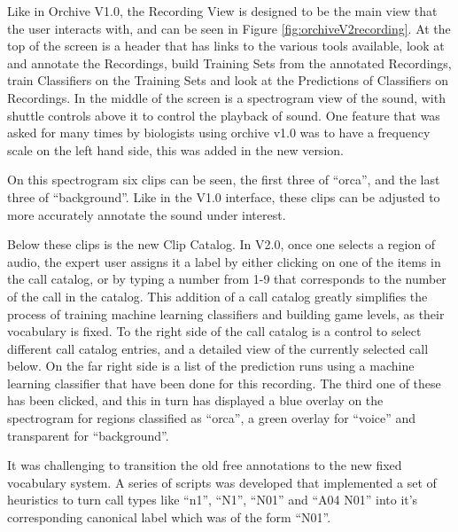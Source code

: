 Like in Orchive V1.0, the Recording View is designed to be the main
view that the user interacts with, and can be seen in Figure
\ref{fig:orchiveV2recording}.  At the top of the screen is a header
that has links to the various tools available, look at and annotate
the Recordings, build Training Sets from the annotated Recordings,
train Classifiers on the Training Sets and look at the Predictions of
Classifiers on Recordings.  In the middle of the screen is a
spectrogram view of the sound, with shuttle controls above it to
control the playback of sound.  One feature that was asked for many
times by biologists using orchive v1.0 was to have a frequency scale on
the left hand side, this was added in the new version.

On this spectrogram six clips can be seen, the first three of
``orca'', and the last three of ``background''.  Like in the V1.0
interface, these clips can be adjusted to more accurately annotate the
sound under interest.

Below these clips is the new Clip Catalog.  In V2.0, once one selects
a region of audio, the expert user assigns it a label by either
clicking on one of the items in the call catalog, or by typing a
number from 1-9 that corresponds to the number of the call in the
catalog.  This addition of a call catalog greatly simplifies the
process of training machine learning classifiers and building game
levels, as their vocabulary is fixed.  To the right side of the call
catalog is a control to select different call catalog entries, and a
detailed view of the currently selected call below.  On the far right
side is a list of the prediction runs using a machine learning
classifier that have been done for this recording.  The third one of
these has been clicked, and this in turn has displayed a blue overlay
on the spectrogram for regions classified as ``orca'', a green overlay
for ``voice'' and transparent for ``background''.

It was challenging to transition the old free annotations to the new
fixed vocabulary system.  A series of scripts was developed that
implemented a set of heuristics to turn call types like ``n1'', ``N1'',
``N01'' and ``A04 N01'' into it's corresponding canonical label which
was of the form ``N01''.

